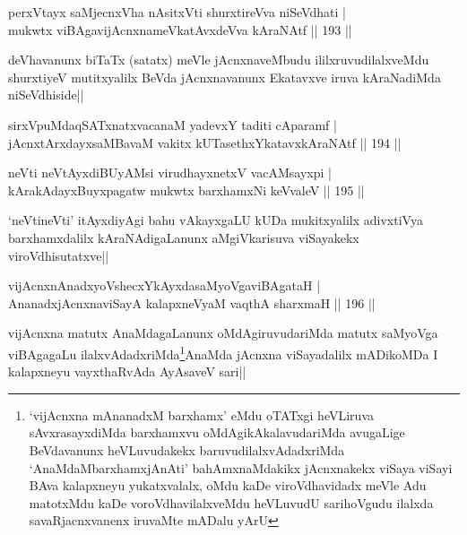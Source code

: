 \begin{shl}
perxVtayx saMjecnxVha nAsitxVti shurxtireVva niSeVdhati |\\
mukwtx viBAgavijAcnxnameVkatAvxdeVva kAraNAtf \hfill || 193 ||
\end{shl}

\begin{artha}
deVhavanunx biTaTx (satatx) meVle jAcnxnaveMbudu  ililxruvudilalxveMdu shurxtiyeV mutitxyalilx BeVda jAcnxnavanunx Ekatavxve iruva kAraNadiMda niSeVdhiside||
\end{artha}

\begin{shl}
sirxVpuMdaqSATxnatxvacanaM yadevxY taditi cAparamf |\\
jAcnxtArxdayxsaMBavaM vakitx kUTasethxYkatavxkAraNAtf \hfill || 194 ||
\end{shl}

\begin{shl}
neVti neVtAyxdiBUyAMsi virudhayxnetxV vacAMsayxpi |\\
kArakAdayxBuyxpagatw mukwtx barxhamxNi keVvaleV \hfill || 195 ||
\end{shl}

\begin{artha}
`neVtineVti' itAyxdiyAgi bahu vAkayxgaLU kUDa mukitxyalilx adivxtiVya barxhamxdalilx kAraNAdigaLanunx aMgiVkarisuva viSayakekx viroVdhisutatxve||
\end{artha}

\begin{shl}
vijAcnxnAnadxyoVshecxYkAyxdasaMyoVgaviBAgataH |\\
AnanadxjAcnxnaviSayA kalapxneVyaM vaqthA sharxmaH \hfill || 196 ||
\end{shl}	

\begin{artha}
vijAcnxna matutx AnaMdagaLanunx oMdAgiruvudariMda matutx saMyoVga viBAgagaLu ilalxvAdadxriMda\footnote[1]{`vijAcnxna mAnanadxM barxhamx' eMdu oTATxgi heVLiruva sAvxrasayxdiMda barxhamxvu oMdAgikAkalavudariMda avugaLige BeVdavanunx heVLuvudakekx baruvudilalxvAdadxriMda `AnaMdaMbarxhamxjAnAti' bahAmxnaMdakikx jAcnxnakekx viSaya viSayi BAva kalapxneyu yukatxvalalx, oMdu kaDe viroVdhavidadx meVle Adu matotxMdu kaDe voroVdhavilalxveMdu heVLuvudU sarihoVgudu ilalxda savaRjacnxvanenx iruvaMte mADalu yArU}AnaMda jAcnxna viSayadalilx mADikoMDa I kalapxneyu vayxthaRvAda AyAsaveV sari||
\end{artha}


